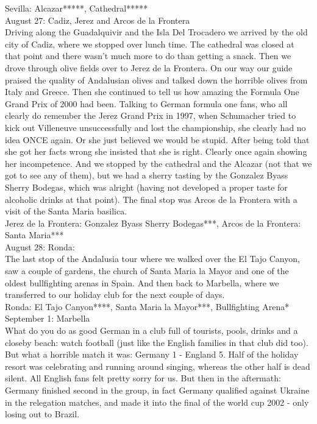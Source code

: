 Sevilla: Alcazar*****, Cathedral*****\\

August 27: Cadiz, Jerez and Arcos de la Frontera\\
Driving along the Guadalquivir and the Isla Del Trocadero we arrived by the old city of Cadiz, where we stopped over lunch time. The cathedral was closed at that point and there wasn't much more to do than getting a snack. Then we drove through olive fields over to Jerez de la Frontera. On our way our guide praised the quality of Andalusian olives and talked down the horrible olives from Italy and Greece. Then she continued to tell us how amazing the Formula One Grand Prix of 2000 had been. Talking to German formula one fans, who all clearly do remember the Jerez Grand Prix in 1997, when Schumacher tried to kick out Villeneuve unsuccessfully and lost the championship, she clearly had no idea ONCE again. Or she just believed we would be stupid. After being told that she got her facts wrong she insisted that she is right. Clearly once again showing her incompetence. And we stopped by the cathedral and the Alcazar (not that we got to see any of them), but we had a sherry tasting by the Gonzalez Byass Sherry Bodegas, which was alright (having not developed a proper taste for alcoholic drinks at that point). The final stop was Arcos de la Frontera with a visit of the Santa Maria basilica.\\

Jerez de la Frontera: Gonzalez Byass Sherry Bodegas***, Arcos de la Frontera: Santa Maria***\\

August 28: Ronda:\\
The last stop of the Andalusia tour where we walked over the El Tajo Canyon, saw a couple of gardens, the church of Santa Maria la Mayor and one of the oldest bullfighting arenas in Spain. And then back to Marbella, where we transferred to our holiday club for the next couple of days.\\

Ronda: El Tajo Canyon****,  Santa Maria la Mayor***, Bullfighting Arena*\\

September 1: Marbella\\
What do you do as good German in a club full of tourists, pools, drinks and a closeby beach: watch football (just like the English families in that club did too). But what a horrible match it was: Germany 1 - England 5. Half of the holiday resort was celebrating and running around singing, whereas the other half is dead silent. All English fans felt pretty sorry for us. But then in the aftermath: Germany finished second in the group, in fact Germany qualified against Ukraine in the relegation matches, and made it into the final of the world cup 2002 - only losing out to Brazil.